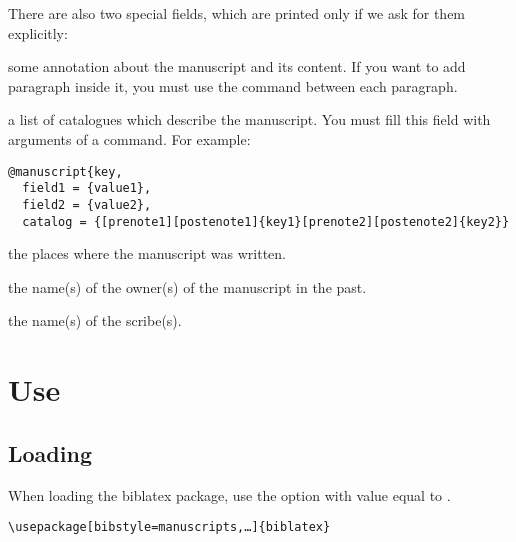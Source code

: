 \documentclass{ltxdockit}[2011/03/25]
\newcommand{\biblatex}{biblatex\xspace}
\begin{document}
There are also two special fields, which are printed only if we ask for them explicitly: 

\begin{fieldlist}
 some annotation about the manuscript and its content. If you want to add paragraph inside it, you must use the  command between each paragraph.


 a list of catalogues which describe the manuscript. You must fill this field with arguments of a  command. For example:

\begin{verbatim}
@manuscript{key,
  field1 = {value1},
  field2 = {value2},
  catalog = {[prenote1][postenote1]{key1}[prenote2][postenote2]{key2}}
\end{verbatim}


 the places where the manuscript was written.

 the name(s) of the owner(s) of the manuscript in the past.

 the name(s) of the scribe(s).

\end{fieldlist}

\section{Use}
\subsection{Loading}

When loading the \biblatex package, use the option  with value equal to .

\begin{verbatim}
\usepackage[bibstyle=manuscripts,…]{biblatex}
\end{verbatim}
\end{document}
